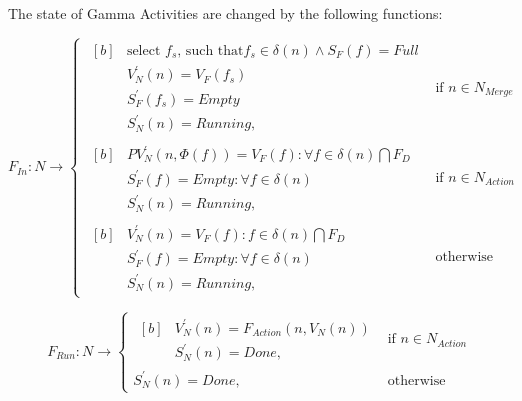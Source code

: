 \begin{definition} 
	The state of Gamma Activities are changed by the following functions:

\begin{equation}
	F_{In} : N \rightarrow
	\begin{cases}
		\begin{aligned}[b]
			&\text{select } f_s \text{, such that} f_s \in \delta(n) \wedge S_F(f) = \mathit{Full} \\
			&V_N^\prime(n) = V_F(f_s) \\
			&S_F^\prime(f_s) = \mathit{Empty} \\
			&S_N^\prime(n) = \mathit{Running},
		\end{aligned} & \text{if } n \in N_\mathit{Merge} \\[8pt]
		\begin{aligned}[b]
			&\mathit{PV}_N^\prime(n, \Phi(f)) = V_F(f) : \forall f \in \delta(n) \bigcap F_D \\
			&S_F^\prime(f) = \mathit{Empty} : \forall f \in \delta(n) \\
			&S_N^\prime(n) = \mathit{Running},
		\end{aligned} & \text{if } n \in N_\mathit{Action} \\[8pt]
		\begin{aligned}[b]
			&V_N^\prime(n) = V_F(f) : f \in \delta(n) \bigcap F_D \\
			&S_F^\prime(f) = \mathit{Empty} : \forall f \in \delta(n) \\
			&S_N^\prime(n) = \mathit{Running},
		\end{aligned} & \text{otherwise}
	\end{cases}
\end{equation}

\begin{equation}
	F_{Run} : N \rightarrow
	\begin{cases}
		\begin{aligned}[b]
			&V_N^\prime(n) = F_{Action}(n, V_N(n)) \\
			&S_N^\prime(n) = \mathit{Done},
		\end{aligned} & \text{if } n \in N_{Action} \\[8pt]
		S_N^\prime(n) = \mathit{Done}, & \text{otherwise}
	\end{cases}
\end{equation}


\end{definition}
